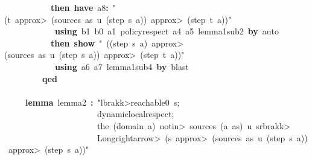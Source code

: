 \documentclass{article}
\newcommand{\syntaxKEYWORDA}[1]{\textcolor[rgb]{0.0,0.4,0.6}{\textbf{#1}}}
\newcommand{\syntaxKEYWORDC}[1]{\textcolor[rgb]{0.0,0.6,1.0}{\textbf{#1}}}
\newcommand{\syntaxLITERALA}[1]{\textcolor[rgb]{1.0,0.0,0.8}{#1}}
\newcommand{\syntaxOPERATOR}[1]{\textcolor[rgb]{0.0,0.0,0.0}{\textbf{#1}}}
\newcommand{\syntaxKEYWORDA}[1]{\textcolor[rgb]{0.0,0.4,0.6}{\textbf{#1}}}
\newcommand{\syntaxKEYWORDC}[1]{\textcolor[rgb]{0.0,0.6,1.0}{\textbf{#1}}}
\newcommand{\syntaxLITERALA}[1]{\textcolor[rgb]{1.0,0.0,0.8}{#1}}
\newcommand{\syntaxOPERATOR}[1]{\textcolor[rgb]{0.0,0.0,0.0}{\textbf{#1}}}
\newcommand{\syntaxKEYWORDA}[1]{\textcolor[rgb]{0.0,0.4,0.6}{\textbf{#1}}}
\newcommand{\syntaxKEYWORDC}[1]{\textcolor[rgb]{0.0,0.6,1.0}{\textbf{#1}}}
\newcommand{\syntaxLITERALA}[1]{\textcolor[rgb]{1.0,0.0,0.8}{#1}}
\newcommand{\syntaxOPERATOR}[1]{\textcolor[rgb]{0.0,0.0,0.0}{\textbf{#1}}}
\newcommand{\syntaxKEYWORDA}[1]{\textcolor[rgb]{0.0,0.4,0.6}{#1}}
\newcommand{\syntaxKEYWORDC}[1]{\textcolor[rgb]{0.0,0.6,1.0}{#1}}
\newcommand{\syntaxLITERALA}[1]{\textcolor[rgb]{1.0,0.0,0.8}{\textbf{#1}}}
\newcommand{\syntaxOPERATOR}[1]{\textcolor[rgb]{0.0,0.0,0.0}{#1}}
\newcommand{\syntaxKEYWORDA}[1]{\textcolor[rgb]{0.0,0.4,0.6}{\textbf{#1}}}
\newcommand{\syntaxKEYWORDC}[1]{\textcolor[rgb]{0.0,0.6,1.0}{\textbf{#1}}}
\newcommand{\syntaxLITERALA}[1]{\textcolor[rgb]{1.0,0.0,0.8}{#1}}
\newcommand{\syntaxOPERATOR}[1]{\textcolor[rgb]{0.0,0.0,0.0}{\textbf{#1}}}
\newcommand{\syntaxKEYWORDA}[1]{\textcolor[rgb]{0.0,0.4,0.6}{\textbf{#1}}}
\newcommand{\syntaxKEYWORDC}[1]{\textcolor[rgb]{0.0,0.6,1.0}{\textbf{#1}}}
\newcommand{\syntaxLITERALA}[1]{\textcolor[rgb]{1.0,0.0,0.8}{#1}}
\newcommand{\syntaxOPERATOR}[1]{\textcolor[rgb]{0.0,0.0,0.0}{\textbf{#1}}}
\begin{document}
{\ }{\ }{\ }{\ }{\ }{\ }{\ }{\ }{\ }{\ }{\ }\syntaxKEYWORDA{then}{\ }\syntaxKEYWORDA{have}{\ }a8\syntaxOPERATOR{:}{\ }\syntaxLITERALA{"(t{\ }\<approx>{\ }(sources{\ }as{\ }u{\ }(step{\ }s{\ }a)){\ }\<approx>{\ }(step{\ }t{\ }a))"}\hspace*{\fill}\\
{\ }{\ }{\ }{\ }{\ }{\ }{\ }{\ }{\ }{\ }{\ }{\ }\syntaxKEYWORDA{using}{\ }b1{\ }b0{\ }a1{\ }policy\usebox{\underscorebox}respect{\ }a4{\ }a5{\ }lemma\usebox{\underscorebox}1\usebox{\underscorebox}sub\usebox{\underscorebox}2{\ }\syntaxKEYWORDA{by}{\ }auto\hspace*{\fill}\\
{\ }{\ }{\ }{\ }{\ }{\ }{\ }{\ }{\ }{\ }{\ }\syntaxKEYWORDA{then}{\ }\syntaxKEYWORDC{show}{\ }\syntaxLITERALA{"{\ }((step{\ }s{\ }a){\ }\<approx>(sources{\ }as{\ }u{\ }(step{\ }s{\ }a)){\ }\<approx>{\ }(step{\ }t{\ }a))"}\hspace*{\fill}\\
{\ }{\ }{\ }{\ }{\ }{\ }{\ }{\ }{\ }{\ }{\ }{\ }\syntaxKEYWORDA{using}{\ }a6{\ }a7{\ }lemma\usebox{\underscorebox}1\usebox{\underscorebox}sub\usebox{\underscorebox}4{\ }\syntaxKEYWORDA{by}{\ }blast\hspace*{\fill}\\
{\ }{\ }{\ }{\ }{\ }{\ }{\ }{\ }{\ }\syntaxKEYWORDA{qed}\hspace*{\fill}\\
\hspace*{\fill}\\
{\ }{\ }{\ }{\ }{\ }\syntaxKEYWORDA{lemma}{\ }lemma\usebox{\underscorebox}2{\ }\syntaxOPERATOR{:}{\ }\syntaxLITERALA{"\<lbrakk>reachable0{\ }s;}\hspace*{\fill}\\
\syntaxLITERALA{{\ }{\ }{\ }{\ }{\ }{\ }{\ }{\ }{\ }{\ }{\ }{\ }{\ }{\ }{\ }{\ }{\ }{\ }{\ }{\ }{\ }{\ }dynamic\usebox{\underscorebox}local\usebox{\underscorebox}respect;}\hspace*{\fill}\\
\syntaxLITERALA{{\ }{\ }{\ }{\ }{\ }{\ }{\ }{\ }{\ }{\ }{\ }{\ }{\ }{\ }{\ }{\ }{\ }{\ }{\ }{\ }{\ }{\ }the{\ }(domain{\ }a){\ }\<notin>{\ }sources{\ }(a{\ }\usebox{\hashbox}{\ }as){\ }u{\ }s\<rbrakk>}\hspace*{\fill}\\
\syntaxLITERALA{{\ }{\ }{\ }{\ }{\ }{\ }{\ }{\ }{\ }{\ }{\ }{\ }{\ }{\ }{\ }{\ }{\ }{\ }{\ }{\ }{\ }{\ }\<Longrightarrow>{\ }(s{\ }\<approx>{\ }(sources{\ }as{\ }u{\ }(step{\ }s{\ }a)){\ }\<approx>{\ }(step{\ }s{\ }a))"}\hspace*{\fill}\\
\end{document}
